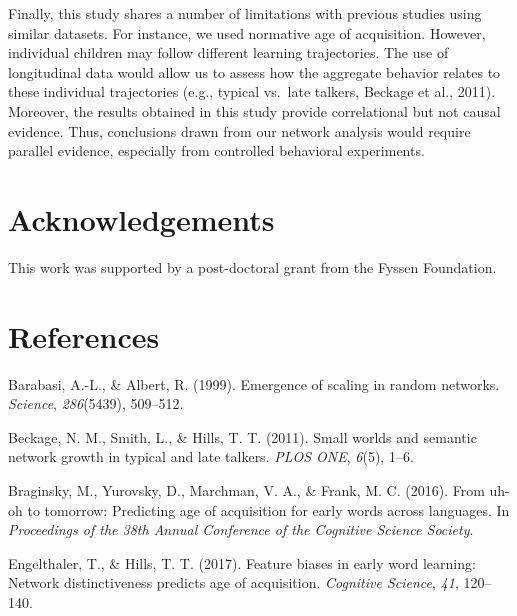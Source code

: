 \documentclass[10pt, letterpaper]{article}
\begin{document}
Finally, this study shares a number of limitations with previous studies
using similar datasets. For instance, we used normative age of
acquisition. However, individual children may follow different learning
trajectories. The use of longitudinal data would allow us to assess how
the aggregate behavior relates to these individual trajectories (e.g.,
typical vs.~late talkers, Beckage et al., 2011). Moreover, the results
obtained in this study provide correlational but not causal evidence.
Thus, conclusions drawn from our network analysis would require parallel
evidence, especially from controlled behavioral experiments.

\vspace{1em}

\vspace{1em}

\section{Acknowledgements}\label{acknowledgements}

This work was supported by a post-doctoral grant from the Fyssen
Foundation.

\section{References}\label{references}

\setlength{\parindent}{-0.1in} \setlength{\leftskip}{0.125in} \noindent

\hypertarget{refs}{}
\hypertarget{ref-barabasi99}{}
Barabasi, A.-L., \& Albert, R. (1999). Emergence of scaling in random
networks. \emph{Science}, \emph{286}(5439), 509--512.

\hypertarget{ref-beckage2011}{}
Beckage, N. M., Smith, L., \& Hills, T. T. (2011). Small worlds and
semantic network growth in typical and late talkers. \emph{PLOS ONE},
\emph{6}(5), 1--6.

\hypertarget{ref-braginsky2016}{}
Braginsky, M., Yurovsky, D., Marchman, V. A., \& Frank, M. C. (2016).
From uh-oh to tomorrow: Predicting age of acquisition for early words
across languages. In \emph{Proceedings of the 38th Annual Conference of
the Cognitive Science Society}.

\hypertarget{ref-engelthaler2017}{}
Engelthaler, T., \& Hills, T. T. (2017). Feature biases in early word
learning: Network distinctiveness predicts age of acquisition.
\emph{Cognitive Science}, \emph{41}, 120--140.
\end{document}
